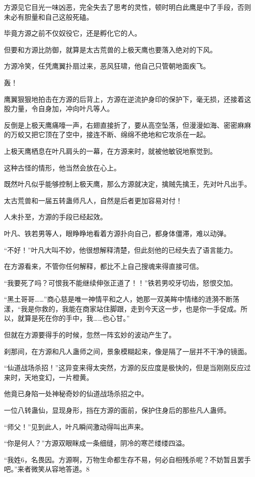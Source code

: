 \begin{this_body}
方源见它目光一味凶恶，完全失去了思考的灵性，顿时明白此鹰是中了手段，否则未必有胆量和自己这般死磕。

毕竟方源之前不仅奴役它，还是孵化它的人。

但要和方源比防御，就算是太古荒兽的上极天鹰也要落入绝对的下风。

方源冷笑，任凭鹰翼扑扇过来，恶风狂啸，他自己只管朝地面疾飞。

轰！

鹰翼狠狠地拍击在方源的后背上，方源在逆流护身印的保护下，毫无损，还接着这股力量，令自身加，冲向叶凡等人。

反倒是上极天鹰痛嚎一声，右翅直接折了，要从高空坠落，但漫漫如海、密密麻麻的万蛟又把它顶在了空中，接连不断、绵绵不绝地和它攻杀在一起。

上极天鹰栖息在叶凡肩头的一幕，在方源来时，就被他敏锐地察觉到。

这种古怪的情形，他当然会放在心上。

既然叶凡似乎能够控制上极天鹰，那么方源就决定，擒贼先擒王，先对叶凡出手。

太古荒兽和一届五转蛊师凡人，自然是后者更加容易对付！

人未扑至，方源的手段已经起效。

叶凡、铁若男等人，眼睁睁地看着方源扑向自己，都身体僵滞，难以动弹。

“不好！”叶凡大叫不妙，他很想解释清楚，但此刻他的已经失去了语言能力。

在方源看来，不管你任何解释，都比不上自己搜魂来得直接可信。

“我要死了吗？可恨我不能继续伸张正道了！！”铁若男咬牙切齿，怒恨交加。

“黑土哥哥……”商心慈是唯一神情平和之人，她那一双美眸中情绪的涟漪不断荡漾，“我是你救的，我能在商家站住脚跟，走到今天这一步，也是你一手促成。所以，就算是死在你的手中，我……也心甘。”

但就在方源要得手的时候，忽然一阵玄妙的波动产生了。

刹那间，在方源和凡人蛊师之间，景象模糊起来，像是隔了一层并不干净的镜面。

“仙道战场杀招！”这异变来得太突然，方源的反应度是极快的，但是当刚刚反应过来时，天地变幻，一片橙黄。

他竟已身陷一处神秘奇妙的仙道战场杀招之中。

一位八转蛊仙，显现身形，挡在方源的面前，保护住身后的那些凡人蛊师。

“师父！”见到此人，叶凡瞬间激动得叫出声来。

“你是何人？”方源双眼眯成一条细缝，阴冷的寒芒缕缕四溢。

“我姓6，名畏因。方源啊，万物生命都生存不易，何必自相残杀呢？不妨暂且罢手吧。”来者微笑从容地答道。8

\end{this_body}

